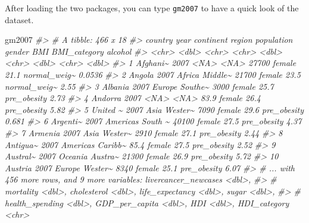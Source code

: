 \documentclass[
]{book}
\newenvironment{Shaded}{\begin{snugshade}}{\end{snugshade}}
\newcommand{\CommentTok}[1]{\textcolor[rgb]{0.56,0.35,0.01}{\textit{#1}}}
\newcommand{\NormalTok}[1]{#1}
\begin{document}
After loading the two packages, you can type \texttt{gm2007} to have a quick look of the dataset.

\begin{Shaded}
\begin{Highlighting}[]
\NormalTok{gm2007}
\CommentTok{\#\textgreater{} \# A tibble: 466 x 18}
\CommentTok{\#\textgreater{}    country   year continent region  population gender   BMI BMI\_category alcohol}
\CommentTok{\#\textgreater{}    \textless{}chr\textgreater{}    \textless{}dbl\textgreater{} \textless{}chr\textgreater{}     \textless{}chr\textgreater{}        \textless{}dbl\textgreater{} \textless{}chr\textgreater{}  \textless{}dbl\textgreater{} \textless{}chr\textgreater{}          \textless{}dbl\textgreater{}}
\CommentTok{\#\textgreater{}  1 Afghani\textasciitilde{}  2007 \textless{}NA\textgreater{}      \textless{}NA\textgreater{}       27700   female  21.1 normal\_weig\textasciitilde{}  0.0536}
\CommentTok{\#\textgreater{}  2 Angola    2007 Africa    Middle\textasciitilde{}    21700   female  23.5 normal\_weig\textasciitilde{}  2.55  }
\CommentTok{\#\textgreater{}  3 Albania   2007 Europe    Southe\textasciitilde{}     3000   female  25.7 pre\_obesity   2.73  }
\CommentTok{\#\textgreater{}  4 Andorra   2007 \textless{}NA\textgreater{}      \textless{}NA\textgreater{}          83.9 female  26.4 pre\_obesity   5.82  }
\CommentTok{\#\textgreater{}  5 United \textasciitilde{}  2007 Asia      Wester\textasciitilde{}     7090   female  29.6 pre\_obesity   0.681 }
\CommentTok{\#\textgreater{}  6 Argenti\textasciitilde{}  2007 Americas  South \textasciitilde{}    40100   female  27.5 pre\_obesity   4.37  }
\CommentTok{\#\textgreater{}  7 Armenia   2007 Asia      Wester\textasciitilde{}     2910   female  27.1 pre\_obesity   2.44  }
\CommentTok{\#\textgreater{}  8 Antigua\textasciitilde{}  2007 Americas  Caribb\textasciitilde{}       85.4 female  27.5 pre\_obesity   2.52  }
\CommentTok{\#\textgreater{}  9 Austral\textasciitilde{}  2007 Oceania   Austra\textasciitilde{}    21300   female  26.9 pre\_obesity   5.72  }
\CommentTok{\#\textgreater{} 10 Austria   2007 Europe    Wester\textasciitilde{}     8340   female  25.1 pre\_obesity   6.07  }
\CommentTok{\#\textgreater{} \# ... with 456 more rows, and 9 more variables: livercancer\_newcases \textless{}dbl\textgreater{},}
\CommentTok{\#\textgreater{} \#   mortality \textless{}dbl\textgreater{}, cholesterol \textless{}dbl\textgreater{}, life\_expectancy \textless{}dbl\textgreater{}, sugar \textless{}dbl\textgreater{},}
\CommentTok{\#\textgreater{} \#   health\_spending \textless{}dbl\textgreater{}, GDP\_per\_capita \textless{}dbl\textgreater{}, HDI \textless{}dbl\textgreater{}, HDI\_category \textless{}chr\textgreater{}}
\end{Highlighting}
\end{Shaded}
\end{document}

